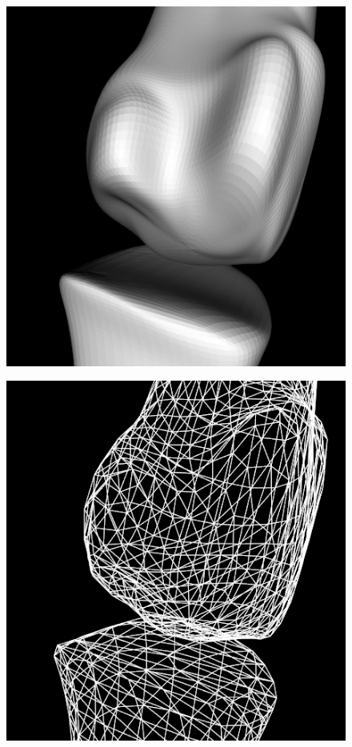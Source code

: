 \documentclass[10pt, conference, compsocconf]{IEEEtran}
\begin{document}
\begin{figure}[htbp]
{\begin{minipage}[h]{0.16\linewidth}
        \includegraphics[width=\textwidth]{./Figure/footbones/fingerBones/loop3.png}\vspace{1ex}\\
      \end{minipage}%
      \begin{minipage}[h]{0.16\linewidth}
        \centering
        \includegraphics[width=\textwidth]{./Figure/footbones/fingerBones/loop1-.png}\\

\end{minipage}}
\end{figure}
\end{document}
